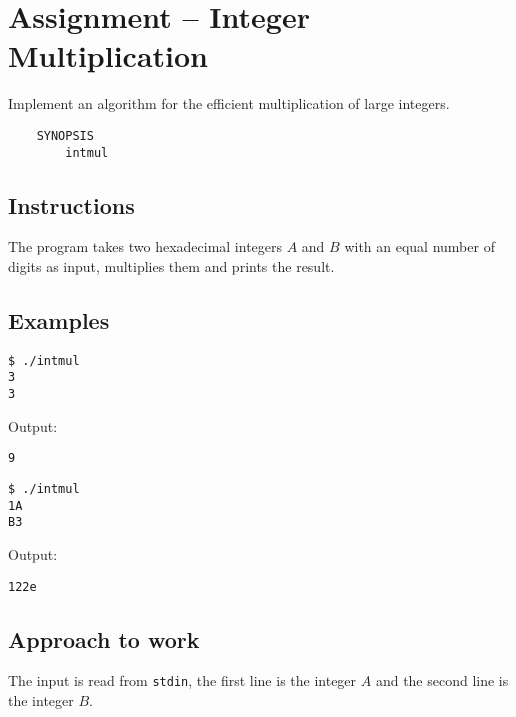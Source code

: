 
\usepackage{amsmath}



\section*{ Assignment -- Integer Multiplication}
Implement an algorithm for the efficient multiplication of large integers. 
\begin{verbatim}
    SYNOPSIS
        intmul
\end{verbatim}

\subsection*{Instructions}
The program takes two hexadecimal integers $A$ and $B$ with an equal number of digits as input, multiplies them and prints the result.
\subsection*{Examples}
\begin{verbatim}
$ ./intmul
3
3
\end{verbatim}
Output: 
\begin{verbatim}
9
\end{verbatim}
\begin{verbatim}
$ ./intmul
1A
B3
\end{verbatim}
Output: 
\begin{verbatim}
122e
\end{verbatim}
\subsection*{Approach to work}
The input is read from \texttt{stdin}, the first line is the integer $A$ and the second line is the integer $B$.

